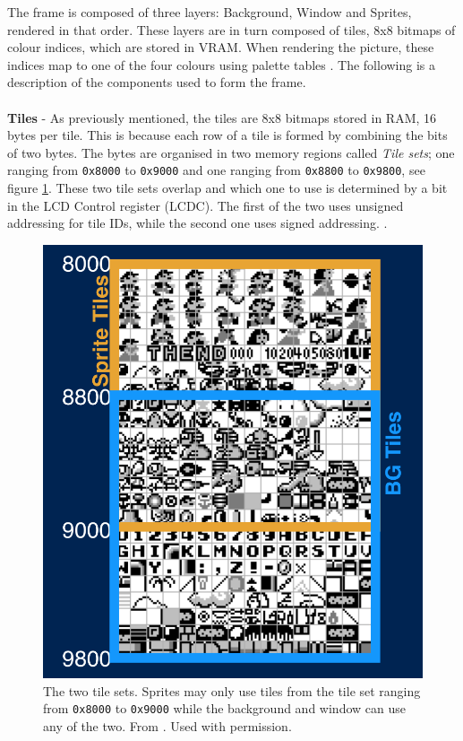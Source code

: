 The frame is composed of three layers: Background, Window and Sprites, rendered in that order. These layers are in turn composed of tiles, 8x8 bitmaps of colour indices, which are stored in VRAM. When rendering the picture, these indices map to one of the four colours using palette tables \cite{gameboyarchitecture}. The following is a description of the components used to form the frame.\\
\\
\textbf{Tiles} - 
As previously mentioned, the tiles are 8x8 bitmaps stored in RAM, 16 bytes per tile. This is because each row of a tile is formed by combining the bits of two bytes. The bytes are organised in two memory regions called \textit{Tile sets}; one ranging from \texttt{0x8000} to \texttt{0x9000} and one ranging from \texttt{0x8800} to \texttt{0x9800}, see figure \ref{fig:ppu_tile_set}. These two tile sets overlap and which one to use is determined by a bit in the LCD Control register (LCDC). The first of the two uses unsigned addressing for tile IDs, while the second one uses signed addressing. \cite{gameboyarchitecture}.
\begin{figure}[H]
    \centering
    \includegraphics[width=0.8\linewidth]{figures/PPU/PPU_tile_sets_divided.png}
    \caption{The two tile sets. Sprites may only use tiles from the tile set ranging from \texttt{0x8000} to \texttt{0x9000} while the background and window can use any of the two. From \cite{ultimateGBtalkSlides}. Used with permission.}
    \label{fig:ppu_tile_set}
\end{figure}

